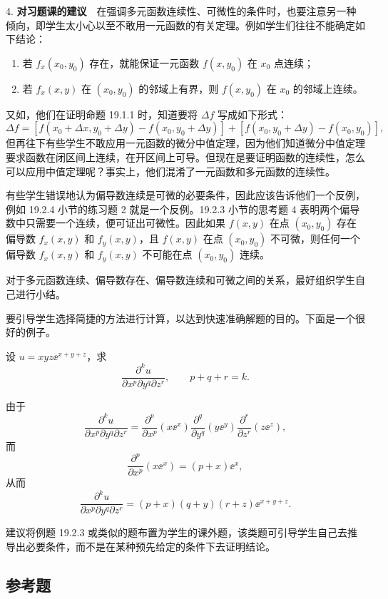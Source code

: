 4. \textbf{对习题课的建议}　在强调多元函数连续性、可微性的条件时，也要注意另一种倾向，即学生太小心以至不敢用一元函数的有关定理。例如学生们往往不能确定如下结论：
\begin{enumerate}[label=(\arabic*)]
  \item 若 $f_x(x_0,y_0)$ 存在，就能保证一元函数 $f(x,y_0)$ 在 $x_0$ 点连续；
  \item 若 $f_x(x,y)$ 在 $(x_0,y_0)$ 的邻域上有界，则 $f(x,y_0)$ 在 $x_0$ 的邻域上连续。
\end{enumerate}
又如，他们在证明命题 19.1.1 时，知道要将 $\Delta f$ 写成如下形式：
\[
  \Delta f=[f(x_0+\Delta x,y_0+\Delta y)-f(x_0,y_0+\Delta y)]
  +[f(x_0,y_0+\Delta y)-f(x_0,y_0)],
\]
但再往下有些学生不敢应用一元函数的微分中值定理，因为他们知道微分中值定理要求函数在闭区间上连续，在开区间上可导。但现在是要证明函数的连续性，怎么可以应用中值定理呢？事实上，他们混淆了一元函数和多元函数的连续性。

有些学生错误地认为偏导数连续是可微的必要条件，因此应该告诉他们一个反例，例如 19.2.4 小节的练习题 2 就是一个反例。19.2.3 小节的思考题 4 表明两个偏导数中只需要一个连续，便可证出可微性。因此如果 $f(x,y)$ 在点 $(x_0,y_0)$ 存在偏导数 $f_x(x,y)$ 和 $f_y(x,y)$，且 $f(x,y)$ 在点 $(x_0,y_0)$ 不可微，则任何一个偏导数 $f_x(x,y)$ 和 $f_y(x,y)$ 不可能在点 $(x_0,y_0)$ 连续。

对于多元函数连续、偏导数存在、偏导数连续和可微之间的关系，最好组织学生自己进行小结。

要引导学生选择简捷的方法进行计算，以达到快速准确解题的目的。下面是一个很好的例子。

\begin{xexample}[19.5.1]
设 $u=xyz\ee^{x+y+z}$，求
\[
  \frac{\partial^k u}{\partial x^p\partial y^q\partial z^r},
  \qquad p+q+r=k.
\]
\end{xexample}
\begin{xsolution}
由于
\[
  \frac{\partial^k u}{\partial x^p\partial y^q\partial z^r}
  =\frac{\partial^p}{\partial x^p}(x\ee^x)
   \frac{\partial^q}{\partial y^q}(y\ee^y)
   \frac{\partial^r}{\partial z^r}(z\ee^z),
\]
而
\[
  \frac{\partial^p}{\partial x^p}(x\ee^x)=(p+x)\ee^x,
\]
从而
\[
  \frac{\partial^k u}{\partial x^p\partial y^q\partial z^r}
  =(p+x)(q+y)(r+z)\ee^{x+y+z}.
\]
\end{xsolution}

建议将例题 19.2.3 或类似的题布置为学生的课外题，该类题可引导学生自己去推导出必要条件，而不是在某种预先给定的条件下去证明结论。

\subsection{参考题}

